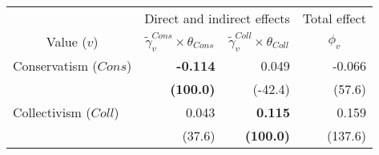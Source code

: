 
\begin{tabular}{lrrr}
\toprule
\multicolumn{1}{c}{ } & \multicolumn{2}{c}{Direct and indirect effects} & \multicolumn{1}{c}{Total effect} \\
\cmidrule(l{3pt}r{3pt}){2-3} \cmidrule(l{3pt}r{3pt}){4-4}
\multicolumn{1}{c}{Value ($v$)} & \multicolumn{1}{c}{$\widetilde{\gamma}^{Cons}_v \times \theta_{Cons}$} & \multicolumn{1}{c}{$\widetilde{\gamma}^{Coll}_v \times \theta_{Coll}$} & \multicolumn{1}{c}{${\phi}_v$}\\
\midrule
Conservatism ($Cons$) & \textbf{-0.114} & 0.049 & -0.066\\
 & \textbf{(100.0)} & (-42.4) & (57.6)\\
Collectivism ($Coll$) & 0.043 & \textbf{0.115} & 0.159\\
 & (37.6) & \textbf{(100.0)} & (137.6)\\
\bottomrule
\end{tabular}
